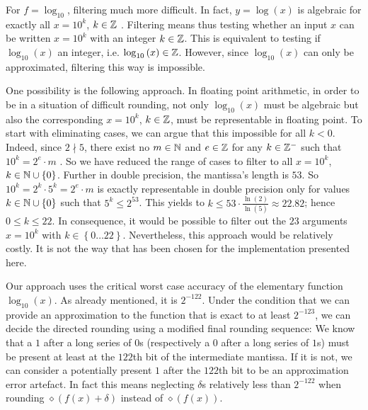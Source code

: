 For $f = \log_{10}$, filtering much more difficult. In fact, $y =
\log\left( x \right)$ is algebraic for exactly all $x = 10^k$, $k \in
\mathbb {Z}$ \cite{Baker75}. Filtering means thus testing whether an input $x$
can be written $x = 10^k$ with an integer $k \in \mathbb {Z}$. This is
equivalent to testing if $\log_{10}\left( x \right)$ an integer,
i.e. $\log_{10}\left( x \right) \in \mathbb {Z}$. However, since $\log_{10}\left( x
\right)$ can only be approximated, filtering this way is
impossible.

One possibility is the following approach. In
floating point arithmetic, in order to be in a situation of difficult
rounding, not only $\log_{10}\left( x \right)$ must be algebraic but
also the corresponding $x = 10^k$, $k \in \mathbb {Z}$, must be representable
in floating point. To start with eliminating cases, we can argue that
this impossible for all $k < 0$. Indeed, since $2 \nmid 5$, there
exist no $m \in \mathbb {N}$ and $e \in \mathbb {Z}$ for any $k \in \mathbb {Z}^-$ such that
$10^k = 2^e \cdot m$ \cite{Muller97}. So we have reduced the range of
cases to filter to all $x = 10^k$, $k \in \mathbb {N} \cup \left \lbrace
0\right \rbrace$. Further in double precision, the mantissa's length
is $53$. So $10^k = 2^k \cdot 5^k = 2^e \cdot m$ is exactly
representable in double precision only for values $k \in \mathbb {N} \cup \left
\lbrace 0 \right \rbrace$ such that $5^k \leq 2^{53}$. This yields to
$k \leq 53 \cdot \frac{\ln\left( 2 \right)}{\ln\left( 5 \right)}
\approx 22.82$; hence $0 \leq k \leq 22$. In consequence, it would be
possible to filter out the $23$ arguments $x = 10^k$ with $k \in \left
\lbrace 0 \dots 22 \right \rbrace$. Nevertheless, this approach would
be relatively costly. It is not the way that has been chosen for the
implementation presented here.

Our approach uses the critical worst case accuracy of the
elementary function $\log_{10}\left( x \right)$. As already mentioned,
it is $2^{-122}$. Under the condition that we can provide an
approximation to the function that is exact to at least $2^{-123}$, we
can decide the directed rounding using a modified final rounding
sequence: We know that a $1$ after a long series of $0$s (respectively
a $0$ after a long series of $1$s) must be present at least at the
$122$th bit of the intermediate mantissa.  If it is not, we can
consider a potentially present $1$ after the $122$th bit to be an
approximation error artefact. In fact this means neglecting $\delta$s
relatively less than $2^{-122}$ when rounding $\diamond \left( f\left(
x \right) + \delta \right)$ instead of $\diamond \left( f\left( x
\right) \right)$. 

